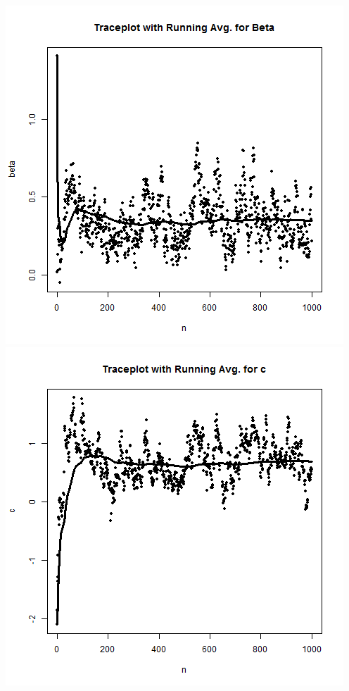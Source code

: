 \documentclass{article}
\begin{document}
\begin{enumerate}
\begin{enumerate}
\includegraphics[scale=0.4]{mixb2.png}
\includegraphics[scale=0.4]{mixc2.png} \\


\end{enumerate}
\end{enumerate}
\end{document}
